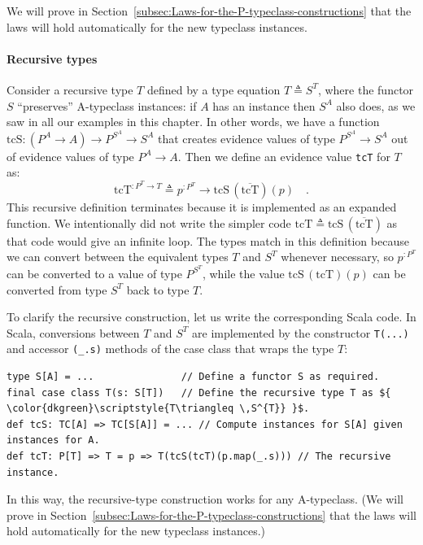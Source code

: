 We will prove in Section~\ref{subsec:Laws-for-the-P-typeclass-constructions}
that the laws will hold automatically for the new typeclass instances.

\paragraph{Recursive types}

Consider a recursive type $T$ defined by a type equation $T\triangleq S^{T}$,
where the functor $S$ \textsf{``}preserves\textsf{''} A-typeclass instances: if $A$
has an instance then $S^{A}$ also does, as we saw in all our examples
in this chapter. In other words, we have a function $\text{tcS}:(P^{A}\rightarrow A)\rightarrow P^{S^{A}}\rightarrow S^{A}$
that creates evidence values of type $P^{S^{A}}\rightarrow S^{A}$
out of evidence values of type $P^{A}\rightarrow A$. Then we define
an evidence value \lstinline!tcT! for $T$ as:
\[
\text{tcT}^{:P^{T}\rightarrow T}\triangleq p^{:P^{T}}\rightarrow\text{tcS}\,(\overline{\text{tcT}})(p)\quad.
\]
This recursive definition terminates because it is implemented as
an expanded function. We intentionally did not write the simpler code
$\text{tcT}\triangleq\text{tcS}\,(\overline{\text{tcT}})$ as that
code would give an infinite loop. The types match in this definition
because we can convert between the equivalent types $T$ and $S^{T}$
whenever necessary, so $p^{:P^{T}}$ can be converted to a value of
type $P^{S^{T}}$, while the value $\text{tcS}\,(\text{tcT})(p)$
can be converted from type $S^{T}$ back to type $T$.

To clarify the recursive construction, let us write the corresponding
Scala code. In Scala, conversions between $T$ and $S^{T}$ are implemented
by the constructor \lstinline!T(...)! and accessor \lstinline!(_.s)!
methods of the case class that wraps the type $T$:
\begin{lstlisting}[mathescape=true]
type S[A] = ...               // Define a functor S as required.
final case class T(s: S[T])   // Define the recursive type T as ${ \color{dkgreen}\scriptstyle{T\triangleq \,S^{T}} }$.
def tcS: TC[A] => TC[S[A]] = ... // Compute instances for S[A] given instances for A.
def tcT: P[T] => T = p => T(tcS(tcT)(p.map(_.s))) // The recursive instance.
\end{lstlisting}
In this way, the recursive-type construction works for any A-typeclass.
(We will prove in Section~\ref{subsec:Laws-for-the-P-typeclass-constructions}
that the laws will hold automatically for the new typeclass instances.)

